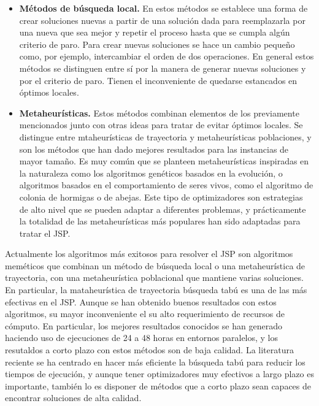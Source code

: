 \begin{itemize}
\item \textbf{Métodos de búsqueda local.} En estos métodos se establece una forma de crear soluciones nuevas a partir de una solución dada para reemplazarla por una nueva 
que sea mejor y repetir el proceso hasta que se cumpla algún criterio de paro.  Para crear nuevas soluciones se hace un cambio pequeño como, por ejemplo, intercambiar el 
orden de dos operaciones.  En general estos métodos se distinguen entre sí por la manera de generar nuevas soluciones y por el criterio de paro. Tienen el inconveniente 
de quedarse estancados en óptimos locales. 

\item \textbf{Metaheurísticas.} Estos métodos combinan elementos de los previamente mencionados junto con otras ideas para tratar de evitar óptimos locales. 
Se distingue entre mtaheurísticas de trayectoria y metaheurísticas poblaciones, y son los métodos que han dado mejores resultados para las instancias de mayor
tamaño. 
%
Es muy común que se planteen metaheurísticas inspiradas en la naturaleza como los algoritmos genéticos basados en la evolución, o algoritmos basados en el 
comportamiento de seres vivos, como el algoritmo de colonia de hormigas o de abejas.
%
Este tipo de optimizadores son estrategias de alto nivel que se pueden adaptar a diferentes problemas, y prácticamente la totalidad de las metaheurísticas más populares
han sido adaptadas para tratar el JSP.
\end{itemize}

Actualmente los algoritmos más exitosos para resolver el JSP son algoritmos meméticos que combinan un método de búsqueda local o una metaheurística de trayectoria,
con una metaheurística poblacional que mantiene varias soluciones. 
%
En particular, la mataheurística de trayectoria búsqueda tabú es una de las más efectivas en el JSP.
%
Aunque se han obtenido buenos resultados con estos algoritmos, su mayor inconveniente el su alto requerimiento de recursos de cómputo.
%
En particular, los mejores resultados conocidos se han generado haciendo uso de ejecuciones de 24 a 48 horas en entornos paralelos, y los resutaldos a corto
plazo con estos métodos son de baja calidad.
%
La literatura reciente se ha centrado en hacer más eficiente la búsqueda tabú para reducir los tiempos de ejecución, y aunque tener optimizadores muy efectivos
a largo plazo es importante, también lo es disponer de métodos que a corto plazo sean capaces de encontrar soluciones de alta calidad.

